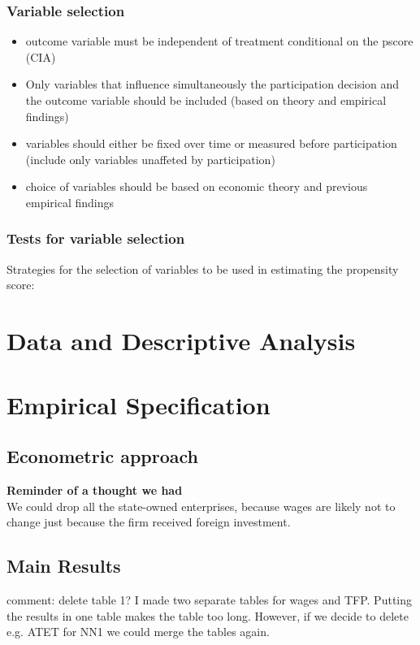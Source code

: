 \documentclass[a4paper,11pt]{scrartcl}
\begin{document}
\subsubsection*{Variable selection}
\begin{itemize}
\item outcome variable must be independent of treatment conditional on the pscore (CIA)
\item Only variables that influence simultaneously the participation decision and the outcome variable should be included (based on theory and empirical findings)
\item variables should either be fixed over time or measured before participation (include only variables unaffeted by participation)
\item choice of variables should be based on economic theory and previous empirical findings
\end{itemize}

\subsubsection*{Tests for variable selection}
Strategies for the selection of variables to be used in estimating the propensity score:



\section{Data and Descriptive Analysis}

\section{Empirical Specification}
\subsection{Econometric approach}
\textbf{Reminder of a thought we had}\\
We could drop all the state-owned enterprises, because wages are likely not to change just because the firm received foreign investment. 

\subsection{Main Results}

comment: delete table 1?  I made two separate tables for wages and TFP. Putting the results in one table makes the table too long. However, if we decide to delete e.g. ATET for NN1 we could merge the tables again. 
\end{document}
